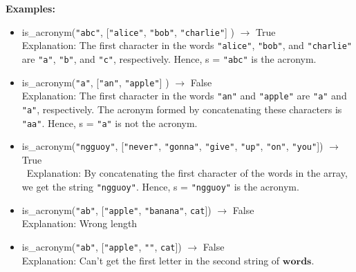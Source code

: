 		\textbf{Examples:}		
		\begin{itemize}
			\item  is\_acronym(\texttt{"abc"}, [\texttt{"alice"}, \texttt{"bob"}, \texttt{"charlie"}] ) 
				$\rightarrow$ True\\
				Explanation: The first character in the words \texttt{"alice"}, \texttt{"bob"}, and 
				\texttt{"charlie"} are \texttt{"a"}, \texttt{"b"}, and \texttt{"c"}, respectively. 
				Hence, s = \texttt{"abc"} is the acronym. 			
			\item  is\_acronym(\texttt{"a"}, [\texttt{"an"}, \texttt{"apple"}] ) $\rightarrow$ False\\
				Explanation: The first character in the words \texttt{"an"} and \texttt{"apple"} are 
				\texttt{"a"} and \texttt{"a"}, respectively. The acronym formed by concatenating these 
				characters is \texttt{"aa"}. Hence, s = \texttt{"a"} is not the acronym.
			\item  is\_acronym(\texttt{"ngguoy"}, [\texttt{"never"}, \texttt{"gonna"}, \texttt{"give"}, 
				\texttt{"up"}, \texttt{"on"}, \texttt{"you"}]) $\rightarrow$ True\\\
				Explanation: By concatenating the first character of the words in the array, we get the 
				string \texttt{"ngguoy"}. Hence, s = \texttt{"ngguoy"} is the acronym.
			\item  is\_acronym(\texttt{"ab"}, [\texttt{"apple"}, \texttt{"banana"}, \texttt{cat}]) 
				$\rightarrow$ False\\
				Explanation: Wrong length
			\item  is\_acronym(\texttt{"ab"}, [\texttt{"apple"}, \texttt{""}, \texttt{cat}]) 
				$\rightarrow$ False\\
				Explanation: Can't get the first letter in the second string of $\bm{words}$.
	
		\end{itemize}




